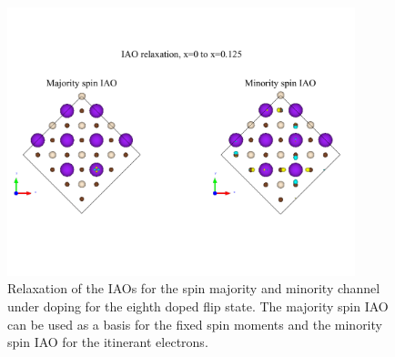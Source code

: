 \documentclass{article}
\begin{document}
\begin{figure}[H]
\centering
\includegraphics[width=0.9\textwidth]{Figures/R3-iao_basis.pdf}
\caption{\label{fig5} Relaxation of the IAOs for the spin majority and minority channel under doping for the eighth doped flip state. The majority spin IAO can be used as a basis for the fixed spin moments and the minority spin IAO for the itinerant electrons.}
\end{figure}
\pagebreak
\end{document}
